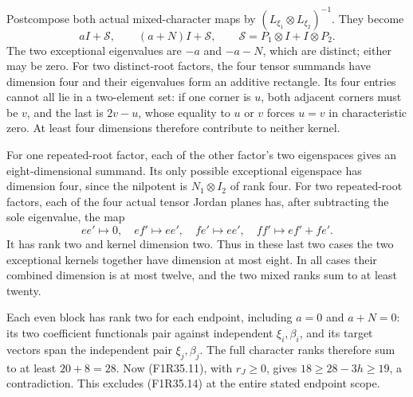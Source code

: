 Postcompose both actual mixed-character maps by
$(L_{\xi_1}\otimes L_{\xi_2})^{-1}$. They become
\[
              aI+\mathcal S,\qquad (a+N)I+\mathcal S,
       \qquad \mathcal S=P_1\otimes I+I\otimes P_2.
 \tag{F1R35.15}
\]
The two exceptional eigenvalues are $-a$ and $-a-N$,
which are distinct; either may be zero.
For two distinct-root factors, the four tensor summands
have dimension four and their eigenvalues form an additive
rectangle. Its four entries cannot all lie in a two-element
set: if one corner is $u$, both adjacent corners must be
$v$, and the last is $2v-u$, whose equality to $u$ or $v$
forces $u=v$ in characteristic zero. At least four
dimensions therefore contribute to neither kernel.

For one repeated-root factor, each of the other factor's
two eigenspaces gives an eight-dimensional summand.
Its only possible exceptional eigenspace has dimension
four, since the nilpotent is $N_1\otimes I_2$ of rank four.
For two repeated-root factors, each of the four actual
tensor Jordan planes has, after subtracting the sole
eigenvalue, the map
\[
 ee'\longmapsto0,\quad ef'\longmapsto ee',\quad
 fe'\longmapsto ee',\quad ff'\longmapsto ef'+fe'.
 \tag{F1R35.16}
\]
It has rank two and kernel dimension two. Thus in these
last two cases the two exceptional kernels together
have dimension at most eight. In all cases their
combined dimension is at most twelve, and the two
mixed ranks sum to at least twenty.

Each even block has rank two for each endpoint, including
$a=0$ and $a+N=0$: its two coefficient functionals pair
against independent $\xi_i,\beta_i$, and its target
vectors span the independent pair $\xi_j,\beta_j$.
The full character ranks therefore sum to at least
$20+8=28$. Now (F1R35.11), with $r_J\ge0$, gives
$18\ge28-3h\ge19$, a contradiction. This excludes
(F1R35.14) at the entire stated endpoint scope.

